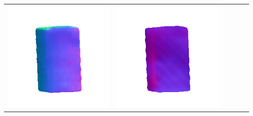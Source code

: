 \begin{tabularx}{\linewidth}{@{}Y@{}Y@{}Y@{}Y@{}Y@{}Y@{}}
\includegraphics[width=\linewidth]{semisynthetic/20160617_18_marrnet_out.png} &
\includegraphics[width=\linewidth]{semisynthetic/20160617_18_ef_out.png} \\

\end{tabularx}
